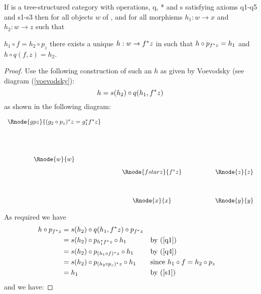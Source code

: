 \documentclass[10pt,a4paper]{scrartcl}
\begin{document}
\begin{lemma}
 If  is a tree-structured category with operations, q, * and s satisfying
axioms q1-q5 and s1-s3 then for all objects $w$ of , and for all
morphisms $h_1: w \rightarrow x$ and $h_2: w \rightarrow z$  such that

$h_1 \circ f = h_2 \circ p_z$ 
there exists a unique $h:w \rightarrow f ^* z$ in    such that
$h \circ p_{f ^* z} = h_1$ and $h \circ q(f,z) = h_2$.
\end{lemma}
\begin{proof}

Use the following construction of such an $h$ as given by Voevodsky  (see diagram (\ref{voevodsky}):
\begin{equation}
h = s(h_2) \circ q(h_1,f ^* z)
\end{equation}
as shown in the following diagram:
\vspace{3mm}
\begin{center}
\begin{equation}
\label{voevodsky}
\begin{array}{cp{0.5cm}cp{1.2cm}c}
\Rnode{gpz}{(g_2 \circ p_z)\sub z = g_1 \sub f \sub z} &&    &&   \\ [1.7cm]
\Rnode{w}{w} &&                     &&           \\ [0.3cm]
             &&\Rnode{fstarz}{f^*z} && \Rnode{z}{z}\\ [1.2cm]
             &&\Rnode{x}{x}         && \Rnode{y}{y}
\end{array}
\end{equation}
\setlength{\arrnodesepA}{3pt}
\end{center}
\noindent
As required we have 
\begin{align*}
h \circ p_{f ^* z}
                 & = s(h_2) \circ q(h_1,f ^* z) \circ p_{f ^* z} &\\
                 & = s(h_2) \circ p_{h_1 ^* f ^* z} \circ h_1 &&\mbox{by (\ref{q1})}\\
								& = s(h_2) \circ p_{(h_1 \circ f) ^* z} \circ h_1 &&\mbox{by (\ref{q4})}\\
								& = s(h_2) \circ p_{(h_2 \circ p_z) ^* z} \circ h_1 &&\mbox{since }h_1 \circ f = h_2 \circ p_z \\
                 & = h_1                                              &&\mbox{by (\ref{s1})}
\end{align*}
\noindent
and we have:


\end{proof}
\end{document}
